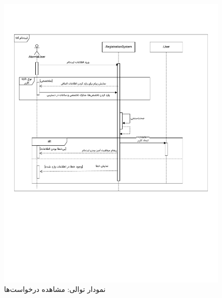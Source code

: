 \begin{figure}[ht!]
	\centering
	\includegraphics[scale=0.8, page=10]{figs/OOD-Sequence-1.pdf}
	\caption{نمودار توالی: مشاهده درخواست‌ها}
\end{figure}
\FloatBarrier
\newpage

